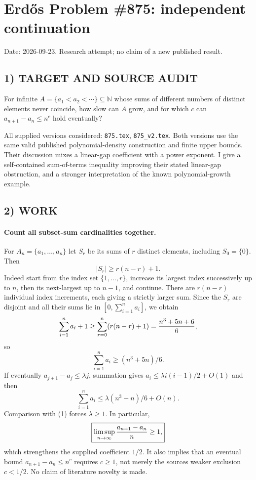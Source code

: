 \section{Erd\H{o}s Problem \#875: independent continuation}
\noindent Date: 2026-09-23. Research attempt; no claim of a new published result.
\subsection{1) TARGET AND SOURCE AUDIT}
For infinite $A=\{a_1<a_2<\cdots\}\subseteq\mathbb N$ whose sums of different numbers of distinct elements never coincide, how slow can $A$ grow, and for which $c$ can $a_{n+1}-a_n\le n^c$ hold eventually?

All supplied versions considered: \texttt{875.tex}, \texttt{875\_v2.tex}.
Both versions use the same valid published polynomial-density construction and finite upper bounds. Their discussion mixes a linear-gap coefficient with a power exponent. I give a self-contained sum-of-terms inequality improving their stated linear-gap obstruction, and a stronger interpretation of the known polynomial-growth example.
\subsection{2) WORK}
\paragraph{Count all subset-sum cardinalities together.}
For $A_n=\{a_1,\ldots,a_n\}$ let $S_r$ be its sums of $r$ distinct elements, including $S_0=\{0\}$. Then
\[
|S_r|\ge r(n-r)+1.
\]
Indeed start from the index set $\{1,\ldots,r\}$, increase its largest index successively up to $n$, then its next-largest up to $n-1$, and continue. There are $r(n-r)$ individual index increments, each giving a strictly larger sum. Since the $S_r$ are disjoint and all their sums lie in $[0,\sum_{i=1}^n a_i]$, we obtain
\[
\sum_{i=1}^n a_i+1\ge\sum_{r=0}^n(r(n-r)+1)
={n^3+5n+6\over6},
\]
so
\[
\boxed{\sum_{i=1}^n a_i\ge(n^3+5n)/6.} \tag{1}
\]
If eventually $a_{j+1}-a_j\le\lambda j$, summation gives $a_i\le\lambda i(i-1)/2+O(1)$ and then
\[
\sum_{i=1}^n a_i\le\lambda(n^3-n)/6+O(n).
\]
Comparison with (1) forces $\lambda\ge1$. In particular,
\[
\boxed{\limsup_{n\to\infty}{a_{n+1}-a_n\over n}\ge1,}
\]
which strengthens the supplied coefficient $1/2$. It also implies that an eventual bound $a_{n+1}-a_n\le n^c$ requires $c\ge1$, not merely the source\textquotesingle s weaker exclusion $c<1/2$. No claim of literature novelty is made.

